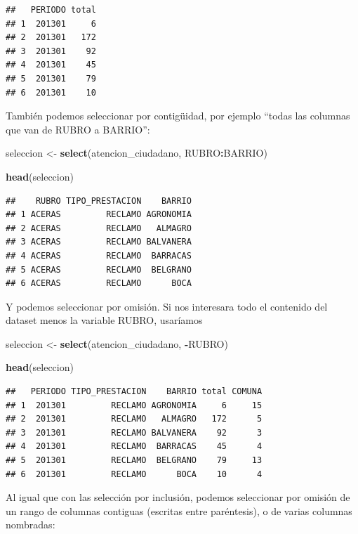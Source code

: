 \documentclass[]{book}
\newenvironment{Shaded}{\begin{snugshade}}{\end{snugshade}}
\newcommand{\KeywordTok}[1]{\textcolor[rgb]{0.13,0.29,0.53}{\textbf{#1}}}
\newcommand{\StringTok}[1]{\textcolor[rgb]{0.31,0.60,0.02}{#1}}
\newcommand{\OperatorTok}[1]{\textcolor[rgb]{0.81,0.36,0.00}{\textbf{#1}}}
\newcommand{\NormalTok}[1]{#1}
\begin{document}
\begin{verbatim}
##   PERIODO total
## 1  201301     6
## 2  201301   172
## 3  201301    92
## 4  201301    45
## 5  201301    79
## 6  201301    10
\end{verbatim}

También podemos seleccionar por contigüidad, por ejemplo ``todas las
columnas que van de RUBRO a BARRIO'':

\begin{Shaded}
\begin{Highlighting}[]
\NormalTok{seleccion <-}\StringTok{ }\KeywordTok{select}\NormalTok{(atencion_ciudadano, RUBRO}\OperatorTok{:}\NormalTok{BARRIO)}

\KeywordTok{head}\NormalTok{(seleccion)}
\end{Highlighting}
\end{Shaded}

\begin{verbatim}
##    RUBRO TIPO_PRESTACION    BARRIO
## 1 ACERAS         RECLAMO AGRONOMIA
## 2 ACERAS         RECLAMO   ALMAGRO
## 3 ACERAS         RECLAMO BALVANERA
## 4 ACERAS         RECLAMO  BARRACAS
## 5 ACERAS         RECLAMO  BELGRANO
## 6 ACERAS         RECLAMO      BOCA
\end{verbatim}

Y podemos seleccionar por omisión. Si nos interesara todo el contenido
del dataset menos la variable RUBRO, usaríamos

\begin{Shaded}
\begin{Highlighting}[]
\NormalTok{seleccion <-}\StringTok{ }\KeywordTok{select}\NormalTok{(atencion_ciudadano, }\OperatorTok{-}\NormalTok{RUBRO)}

\KeywordTok{head}\NormalTok{(seleccion)}
\end{Highlighting}
\end{Shaded}

\begin{verbatim}
##   PERIODO TIPO_PRESTACION    BARRIO total COMUNA
## 1  201301         RECLAMO AGRONOMIA     6     15
## 2  201301         RECLAMO   ALMAGRO   172      5
## 3  201301         RECLAMO BALVANERA    92      3
## 4  201301         RECLAMO  BARRACAS    45      4
## 5  201301         RECLAMO  BELGRANO    79     13
## 6  201301         RECLAMO      BOCA    10      4
\end{verbatim}

Al igual que con las selección por inclusión, podemos seleccionar por
omisión de un rango de columnas contiguas (escritas entre paréntesis), o
de varias columnas nombradas:
\end{document}
